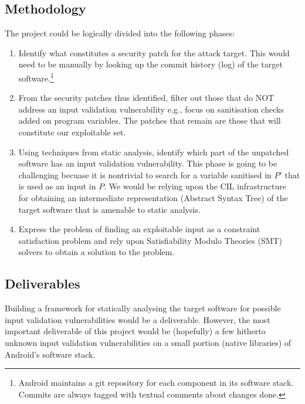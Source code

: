 \subsection{Methodology}\label{meth}
The project could be logically divided into the following phases:
\begin{enumerate}
 \item Identify what constitutes a security patch for the attack target. This would need to be manually by looking up the commit history (log) of the target software.\footnote[1]{Android maintains a git repository for each component in its software stack. Commits are always tagged with textual comments about changes done.}
 \item From the security patches thus identified, filter out those that do NOT address an input validation vulnerability e.g., focus on sanitisation checks added on program variables. The patches that remain are those that will constitute our exploitable set.
 \item Using techniques from static analysis, identify which part of the unpatched software has an input validation vulnerability. This phase is going to be challenging becuase it is nontrivial to search for a variable sanitised in $P'$ that is used as an input in $P$. We would be relying upon the CIL infrastructure~\cite{cilpaper} for obtaining an intermediate representation (Abstract Syntax Tree) of the target software that is amenable to static analysis.
 \item Express the problem of finding an exploitable input as a constraint satisfaction problem and rely upon Satisfiability Modulo Theories (SMT) solvers to obtain a solution to the problem.
\end{enumerate}

\subsection{Deliverables}\label{del}
Building a framework for statically analysing the target software for possible input validation vulnerabilities would be a deliverable. However, the most important deliverable of this project would be (hopefully) a few hitherto unknown input validation vulnerabilities on a small portion (native libraries) of Android's software stack.